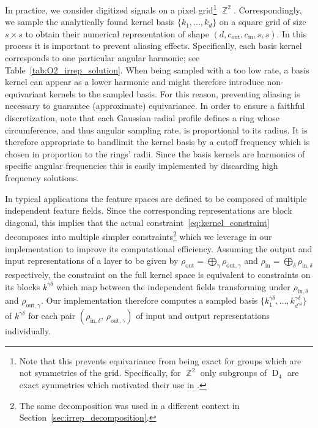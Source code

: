 \documentclass{article}
\DeclareMathOperator*{\Z}{\mathbb{Z}}
\newcommand{\D}[1]{\ensuremath{\operatorname{D}_{#1}}}
\begin{document}
In practice, we consider digitized signals on a pixel grid\footnote{
    Note that this prevents equivariance from being exact for groups which are not symmetries of the grid.
    Specifically, for $\Z^2$ only subgroups of $\D4$ are exact symmetries which motivated their use in \cite{Cohen2016-GCNN,Dieleman2016-CYC,Cohen2017-STEER}.
}
 $\Z^2$.
Correspondingly, we sample the analytically found kernel basis $\{k_1,\dots,k_d\}$ on a square grid of size $s\!\times\!s$ 
to obtain their numerical representation of shape $(d,c_\text{out},c_\text{in},s,s)$.
In this process it is important to prevent aliasing effects.
Specifically, each basis kernel corresponds to one particular angular harmonic; see Table~\ref{tab:O2_irrep_solution}.
When being sampled with a too low rate, a basis kernel can appear as a lower harmonic and might therefore introduce non-equivariant kernels to the sampled basis.
For this reason, preventing aliasing is necessary to guarantee (approximate) equivariance.
In order to ensure a faithful discretization, note that each Gaussian radial profile defines a ring whose circumference, and thus angular sampling rate, is proportional to its radius.
It is therefore appropriate to bandlimit the kernel basis by a cutoff frequency which is chosen in proportion to the rings' radii.
Since the basis kernels are harmonics of specific angular frequencies this is easily implemented by discarding high frequency solutions.

In typical applications the feature spaces are defined to be composed of multiple independent feature fields.
Since the corresponding representations are block diagonal, this implies that the actual constraint~\eqref{eq:kernel_constraint} decomposes into multiple simpler constraints\footnote{
    The same decomposition was used in a different context in Section~\ref{sec:irrep_decomposition}.
}
which we leverage in our implementation to improve its computational efficiency.
Assuming the output and input representations of a layer to be given by
$\rho_\text{out} = \bigoplus_\gamma \rho_{\text{out},\gamma}$
and
$\rho_\text{in}  = \bigoplus_\delta  \rho_{\text{in}, \delta}$
respectively, the constraint on the full kernel space is equivalent to constraints on its blocks $k^{\gamma\delta}$ which map between the independent fields transforming under $\rho_{\text{in},\delta}$ and $\rho_{\text{out},\gamma}$.
Our implementation therefore computes a sampled basis
$\big\{k^{\gamma\delta}_1,\dots,k^{\gamma\delta}_{d^{\gamma\delta}}\big\}$
of $k^{\gamma\delta}$ for each pair
$\left(\rho_{\text{in},\delta},\,\rho_{\text{out},\gamma}\right)$
of input and output representations individually.
\end{document}
